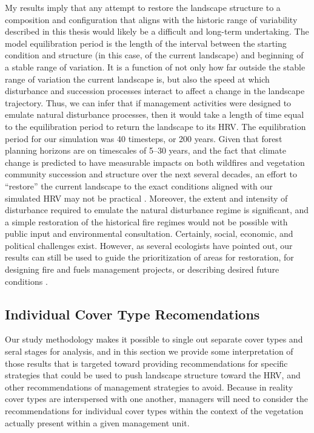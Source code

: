 
My results imply that any attempt to restore the landscape structure to a composition and configuration that aligns with the historic range of variability described in this thesis would likely be a difficult and long-term undertaking. The model equilibration period is the length of the interval between the starting condition and structure (in this case, of the current landscape) and beginning of a stable range of variation. It is a function of not only how far outside the stable range of variation the current landscape is, but also the speed at which disturbance and succession processes interact to affect a change in the landscape trajectory. Thus, we can infer that if management activities were designed to emulate natural disturbance processes, then it would take a length of time equal to the equilibration period to return the landscape to its HRV. The equilibration period for our simulation was 40 timesteps, or 200 years. Given that forest planning horizons are on timescales of 5--30 years, and the fact that climate change is predicted to have measurable impacts on both wildfires and vegetation community succession and structure over the next several decades, an effort to ``restore'' the current landscape to the exact conditions aligned with our simulated HRV may not be practical \citep{Millar1999,Millar2014}. Moreover, the extent and intensity of disturbance required to emulate the natural disturbance regime is significant, and a simple restoration of the historical fire regimes would not be possible with public input and environmental consultation. Certainly, social, economic, and political challenges exist. However, as several ecologists have pointed out, our results can still be used to guide the prioritization of areas for restoration, for designing fire and fuels management projects, or describing desired future conditions \citep{Safford2013,Keeley2000}.



\subsection{Individual Cover Type Recomendations}
Our study methodology makes it possible to single out separate cover types and seral stages for analysis, and in this section we provide some interpretation of those results that is targeted toward providing recommendations for specific strategies that could be used to push landscape structure toward the HRV, and other recommendations of management strategies to avoid. Because in reality cover types are interspersed with one another, managers will need to consider the recommendations for individual cover types within the context of the vegetation actually present within a given management unit.

